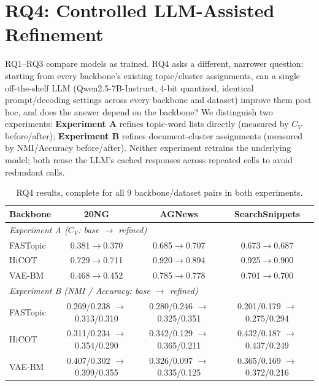 \documentclass[11pt]{article}
\begin{document}
\section{RQ4: Controlled LLM-Assisted Refinement}
\label{sec:rq4}

RQ1--RQ3 compare models as trained. RQ4 asks a different, narrower question: starting from every backbone's existing topic/cluster assignments, can a single off-the-shelf LLM (Qwen2.5-7B-Instruct, 4-bit quantized, identical prompt/decoding settings across every backbone and dataset) improve them post hoc, and does the answer depend on the backbone? We distinguish two experiments: \textbf{Experiment A} refines topic-word lists directly (measured by $C_V$ before/after); \textbf{Experiment B} refines document-cluster assignments (measured by NMI/Accuracy before/after). Neither experiment retrains the underlying model; both reuse the LLM's cached responses across repeated cells to avoid redundant calls.

\begin{table}[h]
\centering
\small
\begin{tabular}{lccc}
\toprule
\textbf{Backbone} & 20NG & AGNews & SearchSnippets \\
\midrule
\multicolumn{4}{l}{\textit{Experiment A ($C_V$: base $\to$ refined)}} \\
FASTopic & 0.381$\to$0.370 & 0.685$\to$0.707 & 0.673$\to$0.687 \\
HiCOT    & 0.729$\to$0.711 & 0.920$\to$0.894 & 0.925$\to$0.900 \\
VAE-BM   & 0.468$\to$0.452 & 0.785$\to$0.778 & 0.701$\to$0.700 \\
\midrule
\multicolumn{4}{l}{\textit{Experiment B (NMI / Accuracy: base $\to$ refined)}} \\
FASTopic & 0.269/0.238 $\to$ 0.313/0.310 & 0.280/0.246 $\to$ 0.325/0.351 & 0.201/0.179 $\to$ 0.275/0.294 \\
HiCOT    & 0.311/0.234 $\to$ 0.354/0.290 & 0.342/0.129 $\to$ 0.365/0.211 & 0.432/0.187 $\to$ 0.437/0.249 \\
VAE-BM   & 0.407/0.302 $\to$ 0.399/0.355 & 0.326/0.097 $\to$ 0.335/0.125 & 0.365/0.169 $\to$ 0.372/0.216 \\
\bottomrule
\end{tabular}
\caption{RQ4 results, complete for all 9 backbone/dataset pairs in both experiments.}
\label{tab:rq4_partial}
\end{table}
\end{document}
